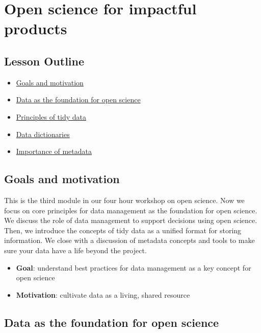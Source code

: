 \documentclass[
  letterpaper,
  DIV=11,
  numbers=noendperiod]{scrreprt}
\providecommand{\tightlist}{%
  \setlength{\itemsep}{0pt}\setlength{\parskip}{0pt}}\usepackage{longtable,booktabs,array}
\begin{document}

\hypertarget{impact}{%
\chapter{Open science for impactful products}\label{impact}}

\hypertarget{lesson-outline-2}{%
\section{Lesson Outline}\label{lesson-outline-2}}

\begin{itemize}
\tightlist
\item
  \protect\hyperlink{goals-and-motivation-3}{Goals and motivation}
\item
  \protect\hyperlink{data-as-the-foundation-for-open-science}{Data as
  the foundation for open science}
\item
  \protect\hyperlink{tidy}{Principles of tidy data}
\item
  \protect\hyperlink{data-dictionaries}{Data dictionaries}
\item
  \protect\hyperlink{importance-of-metadata}{Importance of metadata}
\end{itemize}

\hypertarget{goals-and-motivation-2}{%
\section{Goals and motivation}\label{goals-and-motivation-2}}

This is the third module in our four hour workshop on open science. Now
we focus on core principles for data management as the foundation for
open science. We discuss the role of data management to support
decisions using open science. Then, we introduce the concepts of tidy
data as a unified format for storing information. We close with a
discussion of metadata concepts and tools to make sure your data have a
life beyond the project.

\begin{itemize}
\tightlist
\item
  \textbf{Goal}: understand best practices for data management as a key
  concept for open science
\item
  \textbf{Motivation}: cultivate data as a living, shared resource
\end{itemize}

\hypertarget{data-as-the-foundation-for-open-science}{%
\section{Data as the foundation for open
science}\label{data-as-the-foundation-for-open-science}}
\end{document}
